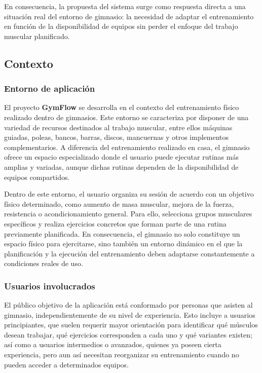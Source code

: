 En consecuencia, la propuesta del sistema surge como respuesta directa a una situación real del entorno de gimnasio: la necesidad de adaptar el entrenamiento en función de la disponibilidad de equipos sin perder el enfoque del trabajo muscular planificado.

\subsection{Contexto}

\subsubsection{Entorno de aplicación}

El proyecto \textbf{GymFlow} se desarrolla en el contexto del entrenamiento físico realizado dentro de gimnasios. Este entorno se caracteriza por disponer de una variedad de recursos destinados al trabajo muscular, entre ellos máquinas guiadas, poleas, bancos, barras, discos, mancuernas y otros implementos complementarios. A diferencia del entrenamiento realizado en casa, el gimnasio ofrece un espacio especializado donde el usuario puede ejecutar rutinas más amplias y variadas, aunque dichas rutinas dependen de la disponibilidad de equipos compartidos.

Dentro de este entorno, el usuario organiza su sesión de acuerdo con un objetivo físico determinado, como aumento de masa muscular, mejora de la fuerza, resistencia o acondicionamiento general. Para ello, selecciona grupos musculares específicos y realiza ejercicios concretos que forman parte de una rutina previamente planificada. En consecuencia, el gimnasio no solo constituye un espacio físico para ejercitarse, sino también un entorno dinámico en el que la planificación y la ejecución del entrenamiento deben adaptarse constantemente a condiciones reales de uso.

\subsubsection{Usuarios involucrados}

El público objetivo de la aplicación está conformado por personas que asisten al gimnasio, independientemente de su nivel de experiencia. Esto incluye a usuarios principiantes, que suelen requerir mayor orientación para identificar qué músculos desean trabajar, qué ejercicios corresponden a cada uno y qué variantes existen; así como a usuarios intermedios o avanzados, quienes ya poseen cierta experiencia, pero aun así necesitan reorganizar su entrenamiento cuando no pueden acceder a determinados equipos.

